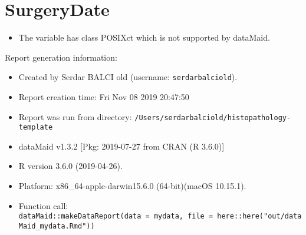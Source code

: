 \documentclass[]{report}
\providecommand{\tightlist}{%
  \setlength{\itemsep}{0pt}\setlength{\parskip}{0pt}}
\begin{document}
\noindent\makebox[\linewidth]{\rule{\textwidth}{0.4pt}}

\hypertarget{surgerydate}{%
\section{SurgeryDate}\label{surgerydate}}

\begin{itemize}
\tightlist
\item
  The variable has class POSIXct which is not supported by dataMaid.
\end{itemize}

\noindent\makebox[\linewidth]{\rule{\textwidth}{0.4pt}}

Report generation information:

\begin{itemize}
\item
  Created by Serdar BALCI old (username: \texttt{serdarbalciold}).
\item
  Report creation time: Fri Nov 08 2019 20:47:50
\item
  Report was run from directory:
  \texttt{/Users/serdarbalciold/histopathology-template}
\item
  dataMaid v1.3.2 {[}Pkg: 2019-07-27 from CRAN (R 3.6.0){]}
\item
  R version 3.6.0 (2019-04-26).
\item
  Platform: x86\_64-apple-darwin15.6.0 (64-bit)(macOS 10.15.1).
\item
  Function call:
  \texttt{dataMaid::makeDataReport(data\ =\ mydata,\ file\ =\ here::here("out/dataMaid\_mydata.Rmd"))}
\end{itemize}
\end{document}
